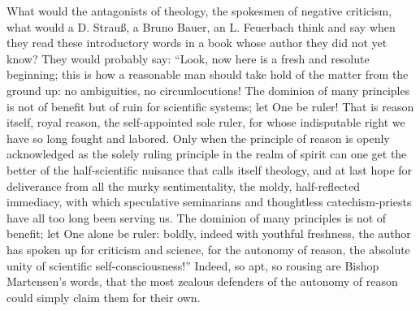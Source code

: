 \documentclass[12pt]{book}
\newcommand{\opage}[1]{\marginnote{\footnotesize\textit{[#1]}}}
\begin{document}
What would the antagonists of theology, the spokesmen of negative criticism, what would a D. Strau\ss{}, a Bruno Bauer, an L. Feuerbach think and say when they read these introductory words in a book whose author they did not yet know? They would probably say: ``Look, now here is a fresh and resolute beginning; this is how a reasonable man should take hold of the matter from the ground up: no ambiguities, no circumlocutions! The dominion of many principles is not of benefit but of ruin for scientific systems; let One be ruler! That is reason itself, royal reason, the self-appointed sole ruler, for whose indisputable right we have so long fought and
\opage{2}\setcounter{footnote}{0}%
labored. Only when the principle of reason is openly acknowledged as the solely ruling principle in the realm of spirit can one get the better of the half-scientific nuisance that calls itself theology, and at last hope for deliverance from all the murky sentimentality, the moldy, half-reflected immediacy, with which speculative seminarians and thoughtless catechism-priests have all too long been serving us. The dominion of many principles is not of benefit; let One alone be ruler: boldly, indeed with youthful freshness, the author has spoken up for criticism and science, for the autonomy of reason, the absolute unity of scientific self-consciousness!'' Indeed, so apt, so rousing are Bishop Martensen's words, that the most zealous defenders of the autonomy of reason could simply claim them for their own.
\end{document}
